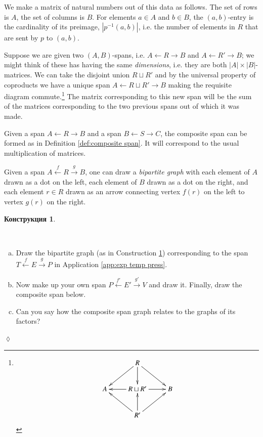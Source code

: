 \documentclass[a4paper]{book}
\def\to{\rightarrow}
\def\from{\leftarrow}
\def\m1{{-1}}
\newcommand{\To}[1]{\xrightarrow{#1}}
\newcommand{\From}[1]{\xleftarrow{#1}}
\theoremstyle{myth}
\newtheorem{constructionENG}[envENG]{\begin{english}Construction\end{english}}
\newtheorem{excENG}[envENG]{\begin{english}Exercise\end{english}}
\newenvironment{exerciseENG}{\begin{excENG}}{\hspace*{\fill}$\lozenge$\end{excENG}}
\newtheorem{constructionRUS}[envRUS]{Конструкция}
\def\sexc{\begin{enumerate}[a.)]\setlength{\itemsep}{.1cm}\setlength{\parskip}{.1cm}\item}
\def\next{\item}
\def\endsexc{\end{enumerate}}
\begin{document}
\begin{russian}
 

We make a matrix of natural numbers out of this data as follows. The set of rows is $A$, the set of columns is $B$. For elements $a\in A$ and $b\in B$, the $(a,b)$-entry is the cardinality of its preimage, $|p^\m1(a,b)|$, i.e. the number of elements in $R$ that are sent by $p$ to $(a,b)$. 

 

Suppose we are given two $(A,B)$-spans, i.e. $A\from R\to B$ and $A\from R'\to B$; we might think of these has having the same {\em dimensions}, i.e. they are both $|A|\times|B|$-matrices. We can take the disjoint union $R\sqcup R'$ and by the universal property of coproducts we have a unique span $A\from R\sqcup R'\to B$ making the requisite diagram commute.\footnote{
$$\xymatrix{
&R\ar[dl]\ar[dr]\ar[d]\\
A&R\sqcup R'\ar[l]\ar[r]&B\\
&R'\ar[ur]\ar[ul]\ar[u]}
$$
}
The matrix corresponding to this new span will be the sum of the matrices corresponding to the two previous spans out of which it was made.

 

Given a span $A\from R\to B$ and a span $B\from S\to C$, the composite span can be formed as in Definition \ref{def:composite span}. It will correspond to the usual multiplication of matrices.

 

\begin{constructionENG}\label{const:bipartite}
Given a span $A\From{f} R\To{g} B$, one can draw a {\em bipartite graph} with each element of $A$ drawn as a dot on the left, each element of $B$ drawn as a dot on the right, and each element $r\in R$ drawn as an arrow connecting vertex $f(r)$ on the left to vertex $g(r)$ on the right.
\end{constructionENG}

\begin{constructionRUS}\label{const:bipartite}
 
\end{constructionRUS}

\begin{exerciseENG}~
\sexc Draw the bipartite graph (as in Construction \ref{const:bipartite}) corresponding to the span $T\From{f}E\To{g}P$ in Application \ref{app:exp temp press}.
\next Now make up your own span $P\From{f'}E'\To{g'}V$ and draw it. Finally, draw the composite span below. 
\next Can you say how the composite span graph relates to the graphs of its factors?
\endsexc
\end{exerciseENG}


\end{russian}
\end{document}
